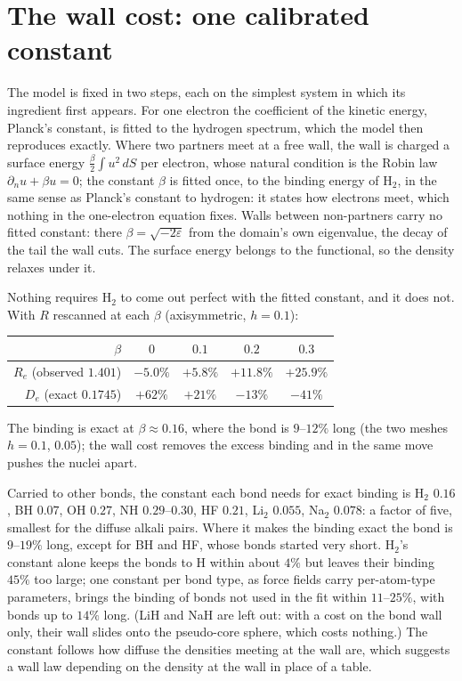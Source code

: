 \section{The wall cost: one calibrated constant}\label{sec:hydride-wallcost}

The model is fixed in two steps, each on the simplest system in which its ingredient first appears. For one
electron the coefficient of the kinetic energy, Planck's constant, is fitted to the hydrogen spectrum, which
the model then reproduces exactly. Where two partners meet at a free wall, the wall is charged a surface
energy $\tfrac{\beta}{2}\int u^2\,dS$ per electron, whose natural condition is the Robin law
$\partial_n u+\beta u=0$; the constant $\beta$ is fitted once, to the binding energy of H$_2$, in the same sense
as Planck's constant to hydrogen: it states how electrons meet, which nothing in the one-electron equation
fixes. Walls between non-partners carry no fitted constant: there $\beta=\sqrt{-2\varepsilon}$ from the domain's
own eigenvalue, the decay of the tail the wall cuts. The surface energy belongs to the functional, so the
density relaxes under it.

Nothing requires H$_2$ to come out perfect with the fitted constant, and it does not. With $R$ rescanned at
each $\beta$ (axisymmetric, $h = 0.1$):
\begin{center}
\small
\begin{tabular}{rcccc}
\toprule
$\beta$ & $0$ & $0.1$ & $0.2$ & $0.3$ \\
\midrule
$R_e$ (observed $1.401$) & $-5.0\%$ & $+5.8\%$ & $+11.8\%$ & $+25.9\%$ \\
$D_e$ (exact $0.1745$) & $+62\%$ & $+21\%$ & $-13\%$ & $-41\%$ \\
\bottomrule
\end{tabular}
\end{center}
The binding is exact at $\beta\approx 0.16$, where the bond is $9$--$12\%$ long (the two meshes $h=0.1$, $0.05$);
the wall cost removes the excess binding and in the same move pushes the nuclei apart.

Carried to other bonds, the constant each bond needs for exact binding is H$_2$ $0.16$, BH $0.07$, OH $0.27$,
NH $0.29$--$0.30$, HF $0.21$, Li$_2$ $0.055$, Na$_2$ $0.078$: a factor of five, smallest for the diffuse alkali
pairs. Where it makes the binding exact the bond is $9$--$19\%$ long, except for BH and HF, whose bonds started
very short. H$_2$'s constant alone keeps the bonds to H within about $4\%$ but leaves their binding $45\%$ too
large; one constant per bond type, as force fields carry per-atom-type parameters, brings the binding of bonds
not used in the fit within $11$--$25\%$, with bonds up to $14\%$ long. (LiH and NaH are left out: with a cost
on the bond wall only, their wall slides onto the pseudo-core sphere, which costs nothing.) The constant follows
how diffuse the densities meeting at the wall are, which suggests a wall law depending on the density at the
wall in place of a table.

